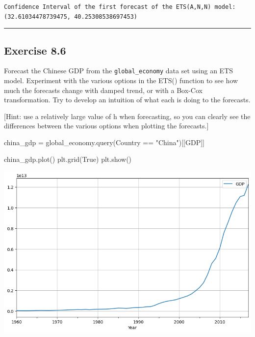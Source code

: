 \documentclass[
  11pt,
]{article}
\newenvironment{Shaded}{\begin{snugshade}}{\end{snugshade}}
\newcommand{\NormalTok}[1]{\textcolor[rgb]{0.00,0.23,0.31}{#1}}
\newcommand{\OperatorTok}[1]{\textcolor[rgb]{0.37,0.37,0.37}{#1}}
\newcommand{\StringTok}[1]{\textcolor[rgb]{0.13,0.47,0.30}{#1}}
\newcommand{\VariableTok}[1]{\textcolor[rgb]{0.07,0.07,0.07}{#1}}
\begin{document}
\begin{verbatim}
Confidence Interval of the first forecast of the ETS(A,N,N) model: 
(32.61034478739475, 40.25308538697453)
\end{verbatim}

\begin{center}\rule{0.5\linewidth}{0.5pt}\end{center}

\subsection{Exercise 8.6}\label{exercise-8.6}

Forecast the Chinese GDP from the \texttt{global\_economy} data set
using an ETS model. Experiment with the various options in the ETS()
function to see how much the forecasts change with damped trend, or with
a Box-Cox transformation. Try to develop an intuition of what each is
doing to the forecasts.

{[}Hint: use a relatively large value of h when forecasting, so you can
clearly see the differences between the various options when plotting
the forecasts.{]}

\begin{Shaded}
\begin{Highlighting}[]
\NormalTok{china\_gdp }\OperatorTok{=}\NormalTok{ global\_economy.query(}\StringTok{\textquotesingle{}Country == "China"\textquotesingle{}}\NormalTok{)[[}\StringTok{\textquotesingle{}GDP\textquotesingle{}}\NormalTok{]]}
\end{Highlighting}
\end{Shaded}

\begin{Shaded}
\begin{Highlighting}[]
\NormalTok{china\_gdp.plot()}
\NormalTok{plt.grid(}\VariableTok{True}\NormalTok{)}
\NormalTok{plt.show()}
\end{Highlighting}
\end{Shaded}

\includegraphics{hw5_files/figure-pdf/cell-28-output-1.png}
\end{document}
